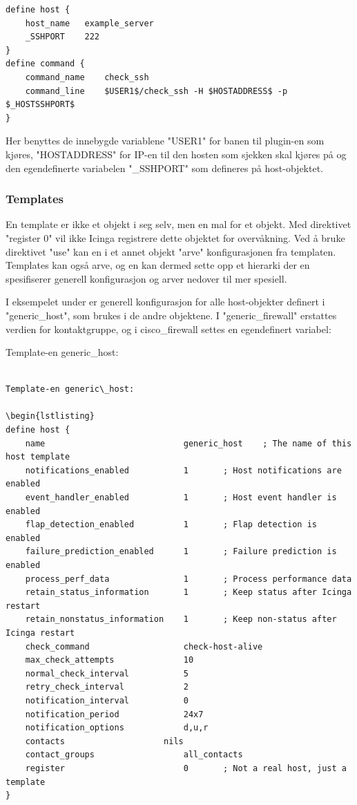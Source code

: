 \begin{lstlisting}[style=example]
define host {
	host_name	example_server
	_SSHPORT	222
}
define command {
	command_name	check_ssh
	command_line	$USER1$/check_ssh -H $HOSTADDRESS$ -p $_HOSTSSHPORT$
}
\end{lstlisting}

Her benyttes de innebygde variablene "USER1" for banen til plugin-en som kjøres, "HOSTADDRESS" for IP-en til den hosten som sjekken skal kjøres på og den egendefinerte variabelen "\_SSHPORT" som defineres på host-objektet.

\subsubsection{Templates}
En template er ikke et objekt i seg selv, men en mal for et objekt. Med direktivet "register 0" vil ikke Icinga registrere dette objektet for overvåkning. Ved å bruke direktivet "use" kan en i et annet objekt "arve" konfigurasjonen fra templaten. Templates kan også arve, og en kan dermed sette opp et hierarki der en spesifiserer generell konfigurasjon og arver nedover til mer spesiell. 

I eksempelet under er generell konfigurasjon for alle host-objekter definert i "generic\_host", som brukes i de andre objektene. I "generic\_firewall" erstattes verdien for kontaktgruppe, og i cisco\_firewall settes en egendefinert variabel:

Template-en generic\_host: 

\begin{lstlisting}[style=example]

Template-en generic\_host: 

\begin{lstlisting}
define host {
	name                            generic_host    ; The name of this host template
	notifications_enabled           1       ; Host notifications are enabled
	event_handler_enabled           1       ; Host event handler is enabled
	flap_detection_enabled          1       ; Flap detection is enabled
	failure_prediction_enabled      1       ; Failure prediction is enabled
	process_perf_data               1       ; Process performance data
	retain_status_information       1       ; Keep status after Icinga restart
	retain_nonstatus_information    1       ; Keep non-status after Icinga restart
	check_command                   check-host-alive
	max_check_attempts              10
	normal_check_interval           5
	retry_check_interval            2
	notification_interval           0
	notification_period             24x7
	notification_options            d,u,r
	contacts                	nils
	contact_groups                  all_contacts
	register                        0       ; Not a real host, just a template
}
\end{lstlisting}

